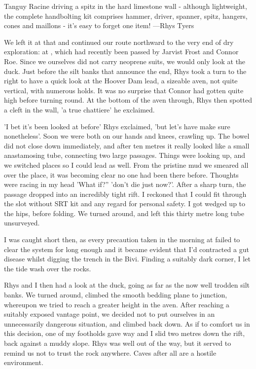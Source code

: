 \begin{marginfigure}
\checkoddpage \ifoddpage \forcerectofloat \else \forceversofloat \fi
\centering
 \caption{Tanguy Racine driving a spitz in the hard limestone wall - although lightweight, the complete handbolting kit comprises hammer, driver, spanner, spitz, hangers, cones and maillons - it's easy to forget one item! ---Rhys Tyers}
 \label{tanguy bolting}
\end{marginfigure}


We left it at that and continued our route northward to the very end of dry exploration: at , which had recently been passed by Jarvist Frost and Connor Roe. Since we ourselves did not carry neoprene suits, we would only look at the duck. Just before the silt banks that announce the end, Rhys took a turn to the right to have a quick look at the Hoover Dam lead, a sizeable aven, not quite vertical, with numerous holds. It was no surprise that Connor had gotten quite high before turning round. At the bottom of the aven through, Rhys then spotted a cleft in the wall, 'a true chattiere' he exclaimed.

'I bet it's been looked at before' Rhys exclaimed, 'but let's have make sure nonetheless'. Soon we were both on our hands and knees, crawling up. The bowel did not close down immediately, and after ten metres it really looked like a small anastamosing tube, connecting two large passages. Things were looking up, and we switched places so I could lead as well. From the pristine mud we smeared all over the place, it was becoming clear no one had been there before. Thoughts were racing in my head 'What if?'' 'don't die just now?'. After a sharp turn, the passage dropped into an incredibly tight rift. I reckoned that I could fit through the slot without SRT kit and any regard for personal safety. I got wedged up to the hips, before folding. We turned around, and left this thirty metre long tube unsurveyed. 

I was caught short then, as every precaution taken in the morning at  failed to clear the system for long enough and it became evident that I'd contracted a gut disease whilst digging the trench in the Bivi. Finding a suitably dark corner, I let the tide wash over the rocks. 

Rhys and I then had a look at the duck, going as far as the now well trodden silt banks. We turned around, climbed the smooth bedding plane to  junction, whereupon we tried to reach a greater height in the aven. After reaching a suitably exposed vantage point, we decided not to put ourselves in an unnecessarily dangerous situation, and climbed back down. As if to comfort us in this decision, one of my footholds gave way and I slid two metres down the rift, back against a muddy slope. Rhys was well out of the way, but it served to remind us not to trust the rock anywhere. Caves after all are a hostile environment. 


